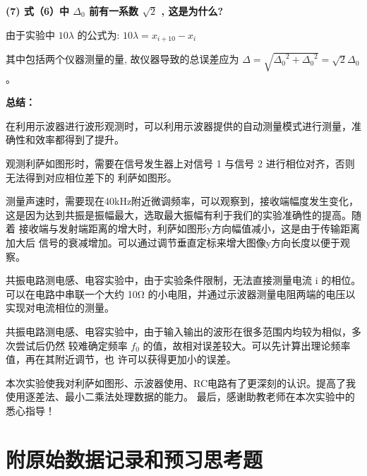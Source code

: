 \documentclass[UTF8]{ctexart}
\begin{document}
\noindent  \textbf{(7) 式（6）中  $\Delta_{0} $ 前有一系数 $ \sqrt{2}$ , 这是为什么?}

由于实验中  $10 \lambda$  的公式为:
$10 \lambda=x_{i+10}-x_i$

其中包括两个仪器测量的量, 
故仪器导致的总误差应为  $\Delta=\sqrt{{\Delta_{0}}^2+{\Delta_{0}}^2} =\sqrt{2} \Delta_{0} $ 。

\noindent  \textbf{总结：}

在利用示波器进行波形观测时，可以利用示波器提供的自动测量模式进行测量，准确性和效率都得到了提升。

观测利萨如图形时，需要在信号发生器上对信号 1 与信号 2 进行相位对齐，否则无法得到对应相位差下的
利萨如图形。

测量声速时，需要现在40kHz附近微调频率，可以观察到，接收端幅度发生变化，
这是因为达到共振是振幅最大，选取最大振幅有利于我们的实验准确性的提高。随着
接收端与发射端距离的增大时，利萨如图形y方向幅值减小，这是由于传输距离加大后
信号的衰减增加。可以通过调节垂直定标来增大图像y方向长度以便于观察。

共振电路测电感、电容实验中，由于实验条件限制，无法直接测量电流 i 的相位。
可以在电路中串联一个大约 10Ω 的小电阻，并通过示波器测量电阻两端的电压以
实现对电流相位的测量。

共振电路测电感、电容实验中，由于输入输出的波形在很多范围内均较为相似，多次尝试后仍然
较难确定频率 $f_0$ 的值，故相对误差较大。可以先计算出理论频率值，再在其附近调节，也
许可以获得更加小的误差。

本次实验使我对利萨如图形、示波器使用、RC电路有了更深刻的认识。提高了我使用逐差法、最小二乘法处理数据的能力。
最后，感谢助教老师在本次实验中的悉心指导！


\section{附原始数据记录和预习思考题}
\end{document}
